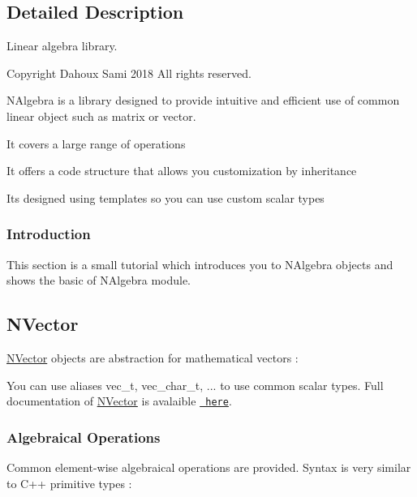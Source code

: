 \subsection{Detailed Description}
Linear algebra library. 

\begin{DoxyCopyright}{Copyright}
Dahoux Sami 2018 All rights reserved.
\end{DoxyCopyright}
N\+Algebra is a library designed to provide intuitive and efficient use of common linear object such as matrix or vector.


\begin{DoxyItemize}
\item It covers a large range of operations
\item It offers a code structure that allows you customization by inheritance
\item It\textquotesingle{}s designed using templates so you can use custom scalar types 
\end{DoxyItemize}\hypertarget{NAlgebraTutoStart}{}\subsubsection{Introduction}\label{NAlgebraTutoStart}
This section is a small tutorial which introduces you to {\ttfamily N\+Algebra} objects and shows the basic of {\ttfamily N\+Algebra} module.\hypertarget{group___n_algebra_NVector}{}\subsection{N\+Vector}\label{group___n_algebra_NVector}
{\ttfamily \mbox{\hyperlink{class_n_vector}{N\+Vector}}} objects are abstraction for mathematical vectors \+:


\begin{DoxyCode}{0}
\end{DoxyCode}


You can use aliases {\ttfamily vec\+\_\+t}, {\ttfamily vec\+\_\+char\+\_\+t}, ... to use common scalar types. Full documentation of {\ttfamily \mbox{\hyperlink{class_n_vector}{N\+Vector}}} is avalaible \href{https://samibendou.github.io/MathToolKitCPP/class_n_vector.html}{\texttt{ here}}.\hypertarget{group___n_algebra_AlgclOpVec}{}\subsubsection{Algebraical Operations}\label{group___n_algebra_AlgclOpVec}
Common element-\/wise algebraical operations are provided. Syntax is very similar to C++ primitive types \+:


